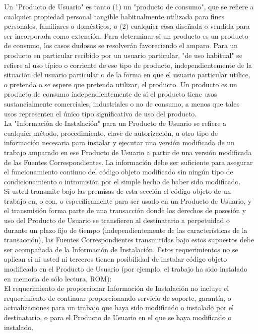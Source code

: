 \begin{enumerate}
\begin{enumerate}
	\end{enumerate}
	
	Un "Producto de Usuario" es tanto (1) un "producto de consumo", que se refiere a cualquier propiedad personal tangible habitualmente utilizada para fines personales, familiares o domésticos, o (2) cualquier cosa diseñada o vendida para ser incorporada como extensión. Para determinar si un producto es un producto de consumo, los casos dudosos se resolverán favoreciendo el amparo. Para un producto en particular recibido por un usuario particular, "de uso habitual" se refiere al uso típico o corriente de ese tipo de producto, independientemente de la situación del usuario particular o de la forma en que el usuario particular utilice, o pretenda o se espere que pretenda utilizar, el producto. Un producto es un producto de consumo independientemente de si el producto tiene usos sustancialmente comerciales, industriales o no de consumo, a menos que tales usos representen el único tipo significativo de uso del producto.\\
	
	La "Información de Instalación" para un Producto de Usuario se refiere a cualquier método, procedimiento, clave de autorización, u otro tipo de información necesaria para instalar y ejecutar una versión modificada de un trabajo amparado en ese Producto de Usuario a partir de una versión modificada de las Fuentes Correspondientes. La información debe ser suficiente para asegurar el funcionamiento continuo del código objeto modificado sin ningún tipo de condicionamiento o intromisión por el simple hecho de haber sido modificado.\\
	
	Si usted transmite bajo las premisas de esta sección el código objeto de un trabajo en, o con, o específicamente para ser usado en un Producto de Usuario, y el transmisión forma parte de una transacción donde los derechos de posesión y uso del Producto de Usuario se transfieren al destinatario a perpetuidad o durante un plazo fijo de tiempo (independientemente de las características de la transacción), las Fuentes Correspondientes transmitidas bajo estos supuestos debe ser acompañada de la Información de Instalación. Estos requerimientos no se aplican si ni usted ni terceros tienen posibilidad de instalar código objeto modificado en el Producto de Usuario (por ejemplo, el trabajo ha sido instalado en memoria de sólo lectura, ROM):\\
	
	El requerimiento de proporcionar Información de Instalación no incluye el requerimiento de continuar proporcionando servicio de soporte, garantía, o actualizaciones para un trabajo que haya sido modificado o instalado por el destinatario, o para el Producto de Usuario en el que se haya modificado o instalado.\\
	

\end{enumerate}
